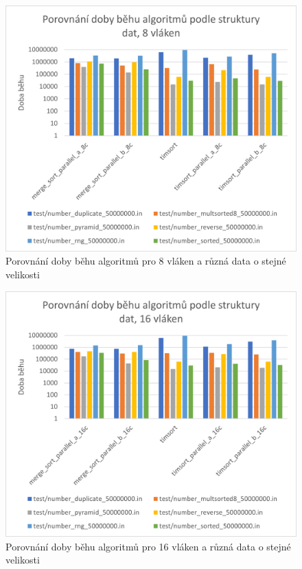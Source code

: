 \documentclass[thesis=B,czech]{FITthesis}[2019/12/23]
\begin{document}
\begin{figure}[htbp]\centering
	\includegraphics[width=13cm]{obrazky/graf30.png}
	\caption[Porovnání doby běhu algoritmů pro 8 vláken a různá data o stejné velikosti]{Porovnání doby běhu algoritmů pro 8 vláken a různá data o stejné velikosti}\label{fig:graf30}
\end{figure}

\begin{figure}[htbp]\centering
	\includegraphics[width=13cm]{obrazky/graf31.png}
	\caption[Porovnání doby běhu algoritmů pro 16 vláken a různá data o stejné velikosti]{Porovnání doby běhu algoritmů pro 16 vláken a různá data o stejné velikosti}\label{fig:graf31}
\end{figure}
\end{document}
